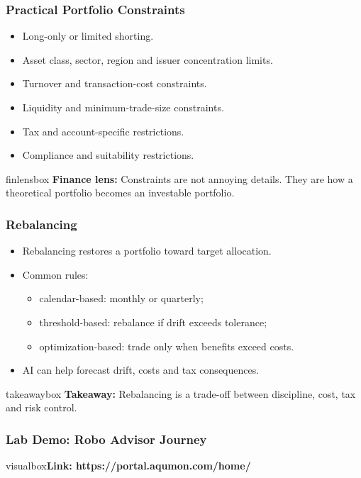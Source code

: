 \documentclass[aspectratio=169,12pt]{beamer}
\newcommand{\currentframetitle}{}
\newcommand{\slideTitle}[1]{\gdef\currentframetitle{#1}\frametitle{#1}}
\newcommand{\finlens}[1]{%
  \vspace{0.08cm}
  \begin{beamercolorbox}[wd=\linewidth,rounded=true,sep=0.18cm]{finlensbox}
    \small\textbf{Finance lens:} #1
  \end{beamercolorbox}%
}
\newcommand{\takeaway}[1]{%
  \vspace{0.08cm}
  \begin{beamercolorbox}[wd=\linewidth,rounded=true,sep=0.18cm]{takeawaybox}
    \small\textbf{Takeaway:} #1
  \end{beamercolorbox}%
}
\begin{document}
\begin{frame}
\slideTitle{Practical Portfolio Constraints}
\begin{itemize}
  \item Long-only or limited shorting.
  \item Asset class, sector, region and issuer concentration limits.
  \item Turnover and transaction-cost constraints.
  \item Liquidity and minimum-trade-size constraints.
  \item Tax and account-specific restrictions.
  \item Compliance and suitability restrictions.
\end{itemize}
\finlens{Constraints are not annoying details. They are how a theoretical portfolio becomes an investable portfolio.}
\end{frame}



\begin{frame}
\slideTitle{Rebalancing}
\begin{itemize}
  \item Rebalancing restores a portfolio toward target allocation.
  \item Common rules:
  \begin{itemize}
    \item calendar-based: monthly or quarterly;
    \item threshold-based: rebalance if drift exceeds tolerance;
    \item optimization-based: trade only when benefits exceed costs.
  \end{itemize}
  \item AI can help forecast drift, costs and tax consequences.
\end{itemize}
\takeaway{Rebalancing is a trade-off between discipline, cost, tax and risk control.}
\end{frame}

\begin{frame}
\slideTitle{Lab Demo: Robo Advisor Journey}
\footnotesize
\begin{beamercolorbox}[wd=\linewidth,rounded=true,sep=0.12cm]{visualbox}\scriptsize\textbf{Link: https://portal.aqumon.com/home/} \end{beamercolorbox}
\end{frame}
\end{document}

